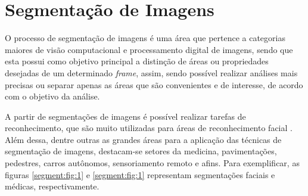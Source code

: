 \newpage
\section{Segmentação de Imagens}
O processo de segmentação de imagens é uma área que pertence a categorias maiores de visão computacional e processamento digital de imagens, sendo que esta possui como objetivo principal a distinção de áreas ou propriedades desejadas \cite{Haralick1985, Yuheng2017ImageOverview, Ghosh2019} de um determinado \textit{frame}, assim, sendo possível realizar análises mais precisas ou separar apenas as áreas que são convenientes e de interesse, de acordo com o objetivo da análise.

A partir de segmentações de imagens é possível realizar tarefas de reconhecimento, que são muito utilizadas para áreas de reconhecimento facial \cite{Yuheng2017ImageOverview}. Além dessa, dentre outras as grandes áreas para a aplicação das técnicas de segmentação de imagens, destacam-se setores da medicina, pavimentações, pedestres, carros autônomos, sensoriamento remoto e afins. Para exemplificar, as figuras \ref{segment:fig:1} e \ref{segment:fig:1} representam segmentações faciais e médicas, respectivamente.  

